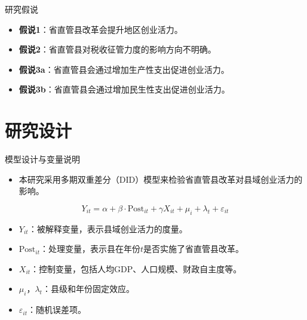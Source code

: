 \documentclass{beamer}
\newcommand{\tightlist}{%
  \setlength{\itemsep}{0pt}\setlength{\parskip}{0pt}}
\begin{document}
\begin{frame}{研究假说}
\label{ux7814ux7a76ux5047ux8bf4}
\begin{itemize}
\tightlist
\item
  \textbf{假说1}：省直管县改革会提升地区创业活力。
\item
  \textbf{假说2}：省直管县对税收征管力度的影响方向不明确。
\item
  \textbf{假说3a}：省直管县会通过增加生产性支出促进创业活力。
\item
  \textbf{假说3b}：省直管县会通过增加民生性支出促进创业活力。
\end{itemize}
\end{frame}

\section{研究设计}\label{ux7814ux7a76ux8bbeux8ba1}

\begin{frame}{模型设计与变量说明}
\label{ux6a21ux578bux8bbeux8ba1ux4e0eux53d8ux91cfux8bf4ux660e}
\begin{itemize}
\tightlist
\item
  本研究采用多期双重差分（DID）模型来检验省直管县改革对县域创业活力的影响。
\end{itemize}

\[
Y_{it} = \alpha + \beta \cdot \text{Post}_{it} + \gamma X_{it} + \mu_i + \lambda_t + \varepsilon_{it}
\]

\begin{itemize}
\tightlist
\item
  \(Y_{it}\)：被解释变量，表示县域创业活力的度量。
\item
  \(\text{Post}_{it}\)：处理变量，表示县在年份\(t\)是否实施了省直管县改革。
\item
  \(X_{it}\)：控制变量，包括人均GDP、人口规模、财政自主度等。
\item
  \(\mu_i\)，\(\lambda_t\)：县级和年份固定效应。
\item
  \(\varepsilon_{it}\)：随机误差项。
\end{itemize}
\end{frame}
\end{document}
